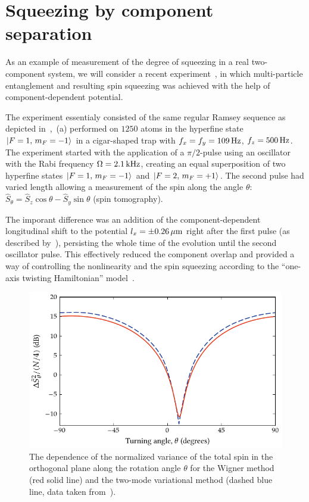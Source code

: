 \section{Squeezing by component separation}

As an example of measurement of the degree of squeezing in a real two-component  system, we will consider a recent experiment~\cite{Riedel2010}, in which multi-particle entanglement and resulting spin squeezing was achieved with the help of component-dependent potential.

The experiment essentialy consisted of the same regular Ramsey sequence as depicted in~,~(a) performed on $1250$ \Rb{} atoms in the hyperfine state ${\mbox{\ensuremath{\vert F=1,\, m_F=-1 \rangle}}}$ in a cigar-shaped trap with $f_x = f_y = 109\mbox{\ensuremath{\,\mathrm{Hz}}}$, $f_z = 500\mbox{\ensuremath{\,\mathrm{Hz}}}$.
The experiment started with the application of a $\pi/2$-pulse using an oscillator with the Rabi frequency $\Omega=2.1\mbox{\ensuremath{\,\mathrm{kHz}}}$, creating an equal superposition of two hyperfine states ${\mbox{\ensuremath{\vert F=1,\, m_F=-1 \rangle}}}$ and ${\mbox{\ensuremath{\vert F=2,\, m_F=+1 \rangle}}}$.
The second pulse had varied length allowing a measurement of the spin along the angle $\theta$: $\hat{S}_\theta = \hat{S}_z \cos \theta - \hat{S}_y \sin \theta$ (spin tomography).

The imporant difference was an addition of the component-dependent longitudinal shift to the potential $l_x = \pm 0.26\mbox{\ensuremath{\,\mathrm{\mu m}}}$ right after the first pulse (as described by~), persisting the whole time of the evolution until the second oscillator pulse.
This effectively reduced the component overlap and provided a way of controlling the nonlinearity and the spin squeezing according to the ``one-axis twisting Hamiltonian'' model~\cite{Kitagawa1993}.

\begin{figure}
    \centerline{\includegraphics{figures_generated/bec_squeezing/riedel_rotation.pdf}}

    \caption{
    The dependence of the normalized variance of the total spin in the orthogonal plane along the rotation angle $\theta$ for the Wigner method (red solid line) and the two-mode variational method (dashed blue line, data taken from~\cite{Riedel2010}).
    }
    \label{fig:bec-squeezing:separation:tomography}
\end{figure}

